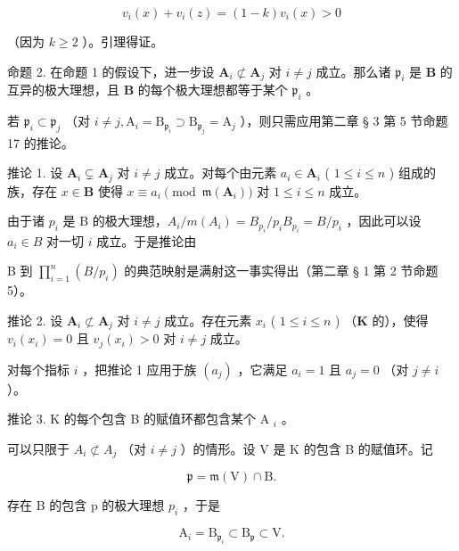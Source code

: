 \[
v _ {i} (x) + v _ {i} (z) = (1 - k) v _ {i} (x) > 0
\]

（因为 \(k \geqslant 2\) ）。引理得证。

命题 2. 在命题 1 的假设下，进一步设 \(\mathbf{A}_i \not\subset \mathbf{A}_j\) 对 \(i \neq j\) 成立。那么诸 \(\mathfrak{p}_i\) 是 \(\mathbf{B}\) 的互异的极大理想，且 \(\mathbf{B}\) 的每个极大理想都等于某个 \(\mathfrak{p}_i\) 。

若 \(\mathfrak{p}_i\subset \mathfrak{p}_j\) （对 \(i\neq j,\mathrm{A}_i = \mathrm{B}_{\mathfrak{p}_i}\supset \mathrm{B}_{\mathfrak{p}_j} = \mathrm{A}_j\) ），则只需应用第二章 § 3 第 5 节命题 17 的推论。

推论 1. 设 \(\mathbf{A}_i \subsetneq \mathbf{A}_j\) 对 \(i \neq j\) 成立。对每个由元素 \(a_i \in \mathbf{A}_i\) ( \(1 \leqslant i \leqslant n\) ) 组成的族，存在 \(x \in \mathbf{B}\) 使得 \(x \equiv a_i \pmod{\mathfrak{m}(\mathbf{A}_i)}\) 对 \(1 \leqslant i \leqslant n\) 成立。

由于诸 \(p_i\) 是 B 的极大理想，\(A_i / m(A_i) = B_{p_i} / p_i B_{p_i} = B / p_i\) ，因此可以设 \(a_i \in B\) 对一切 \(i\) 成立。于是推论由

B 到 \(\prod_{i=1}^{n} (B/p_i)\) 的典范映射是满射这一事实得出（第二章 § 1 第 2 节命题 5）。

推论 2. 设 \(\mathbf{A}_i \not\subset \mathbf{A}_j\) 对 \(i \neq j\) 成立。存在元素 \(x_i\) ( \(1 \leqslant i \leqslant n\) ) （\(\mathbf{K}\) 的），使得 \(v_i(x_i) = 0\) 且 \(v_j(x_i) > 0\) 对 \(i \neq j\) 成立。

对每个指标 \(i\) ，把推论 1 应用于族 \((a_{j})\) ，它满足 \(a_{i} = 1\) 且 \(a_{j} = 0\) （对 \(j \neq i\) ）。

推论 3. K 的每个包含 B 的赋值环都包含某个 A \(_{i}\) 。

可以只限于 \(A_{i} \not\subset A_{j}\) （对 \(i \neq j\) ）的情形。设 V 是 K 的包含 B 的赋值环。记

\[
\mathfrak {p} = \mathfrak {m} (\mathrm{V}) \cap \mathrm{B}.
\]

存在 B 的包含 p 的极大理想 \(p_{i}\) ，于是

\[
\mathrm{A} _ {i} = \mathrm{B} _ {\mathfrak {p} _ {i}} \subset \mathrm{B} _ {\mathfrak {p}} \subset \mathrm{V}.
\]

